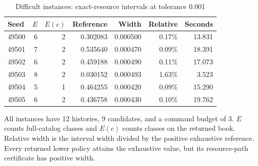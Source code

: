 \begin{table}[p]\centering
\caption{Difficult instances: exact-resource intervals at tolerance 0.001}\label{tab:stress52}
\setlength{\tabcolsep}{4pt}
\begin{tabular}{lrrrrrr}
\toprule
Seed & $E$ & $E(c)$ & Reference & Width & Relative & Seconds\\
\midrule
49500 & 6 & 2 & 0.302083 & 0.000500 & 0.17\% & 13.831\\
49501 & 7 & 2 & 0.535640 & 0.000470 & 0.09\% & 18.391\\
49502 & 6 & 2 & 0.459188 & 0.000490 & 0.11\% & 17.073\\
49503 & 8 & 2 & 0.030152 & 0.000493 & 1.63\% & 3.523\\
49504 & 5 & 1 & 0.464255 & 0.000420 & 0.09\% & 15.290\\
49505 & 6 & 2 & 0.436758 & 0.000430 & 0.10\% & 19.762\\
\bottomrule\end{tabular}
\par\vspace{6pt}\begin{minipage}{\textwidth}All instances have 12 histories, 9 candidates, and a command budget of 3. $E$ counts full-catalog classes and $E(c)$ counts classes on the returned book. Relative width is the interval width divided by the positive exhaustive reference. Every returned lower policy attains the exhaustive value, but its resource-path certificate has positive width.\end{minipage}
\end{table}
